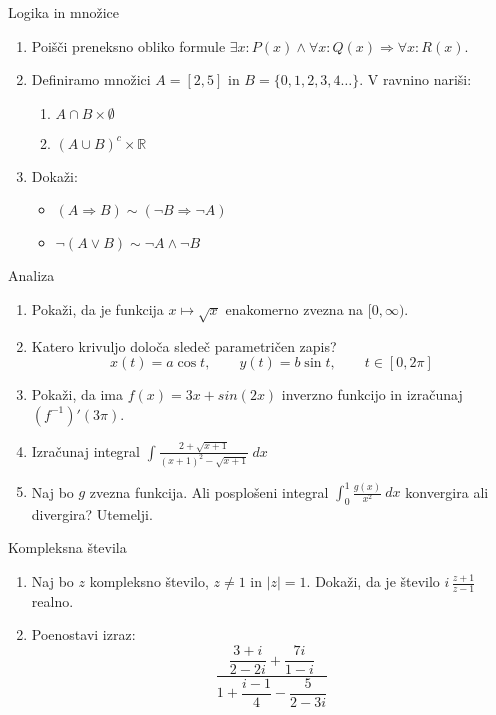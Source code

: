 \begin{frame}{Logika in množice}
	\begin{enumerate}
		\item
		Poišči preneksno obliko formule \( \exists x : P(x) \wedge \forall x : Q(x) \Rightarrow \forall x : R(x)\).
		\item 
		Definiramo množici \(A = [2,5]\) in \(B = \{0,1,2,3,4 \dots\} \).
		V ravnino nariši:
		\begin{enumerate}
		   \item \( A \cap B \times \emptyset \)
		   \item \((A \cup B)^c \times \mathbb{R} \)
		\end{enumerate}
		\item
		Dokaži:
		\begin{itemize}
			\item \((A \Rightarrow B) \sim (\neg B \Rightarrow \neg A)\)
			\item \(\neg(A \vee B) \sim \neg A \wedge \neg B\)
		\end{itemize}
	\end{enumerate}
\end{frame}

\begin{frame}{Analiza}
	\begin{enumerate}
		\item
		Pokaži, da je funkcija \( x \mapsto \sqrt{x}\) enakomerno zvezna na \([0, \infty)\).
		\item 
		Katero krivuljo določa sledeč parametričen zapis?
		$$
		   x(t) = a \cos t, \qquad %
		   y(t) = b \sin t, \qquad %
		   t \in [0, 2 \pi]
		$$ 
		\item
		Pokaži, da ima $f(x) = 3x + sin(2x)$ inverzno funkcijo in izračunaj $(f^{-1})'(3 \pi)$.
		
		\item
		Izračunaj integral 
		$
		\displaystyle
		\int \frac{2+\sqrt{x+1}}{(x+1)^2-\sqrt{x+1}} \ dx
		$
		\item 
		Naj bo $g$ zvezna funkcija. Ali posplošeni integral 
		$\int_{0}^{1} \frac{g(x)}{x^2} \ dx$
		konvergira ali divergira? Utemelji.
	\end{enumerate}
\end{frame}

\begin{frame}{Kompleksna števila}
	\begin{enumerate}
		\item
		Naj bo $z$ kompleksno število, $z \ne 1$ in \(|z| = 1\).
		Dokaži, da je število \( i \, \frac{z+1}{z-1} \) realno.
		\item
		Poenostavi izraz:
		\[
		\frac{\dfrac{3+i}{2-2i} + \dfrac{7i}{1-i}}{1 + \dfrac{i-1}{4} - \dfrac{5}{2-3i}}
		\]
	\end{enumerate}
\end{frame}